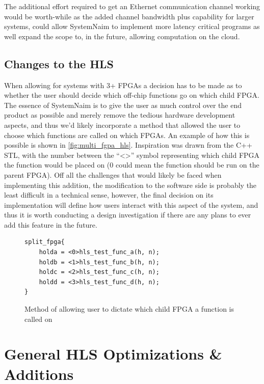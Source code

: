 The additional effort required to get an Ethernet communication channel working would be worth-while as the added channel bandwidth plus capability for larger systems, could allow SystemNaim to implement more latency critical programs as well expand the scope to, in the future, allowing computation on the cloud.

\subsection{Changes to the HLS}

When allowing for systems with 3+ FPGAs a decision has to be made as to whether the user should decide which off-chip functions go on which child FPGA. The essence of SystemNaim is to give the user as much control over the end product as possible and merely remove the tedious hardware development aspects, and thus we'd likely incorporate a method that allowed the user to choose which functions are called on which FPGAs. An example of how this is possible is shown in \autoref{fig:multi_fgpa_hls}. Inspiration was drawn from the C++ STL, with the number between the “<>” symbol representing which child FPGA the function would be placed on (0 could mean the function should be run on the parent FPGA). Off all the challenges that would likely be faced when implementing this addition, the modification to the software side is probably the least difficult in a technical sense, however, the final decision on its implementation will define how users interact with this aspect of the system, and thus it is worth conducting a design investigation if there are any plans to ever add this feature in the future.

\begin{figure}[!h]
    \centering
    \begin{minipage}{0.5\textwidth}
    \begin{verbatim}
split_fpga{
    holda = <0>hls_test_func_a(h, n);
    holdb = <1>hls_test_func_b(h, n);
    holdc = <2>hls_test_func_c(h, n);
    holdd = <3>hls_test_func_d(h, n);
}
    \end{verbatim}     
    \end{minipage}
    \caption{Method of allowing user to dictate which child FPGA a function is called on}
    \label{fig:multi_fgpa_hls}
\end{figure}

\section{General HLS Optimizations \& Additions}

